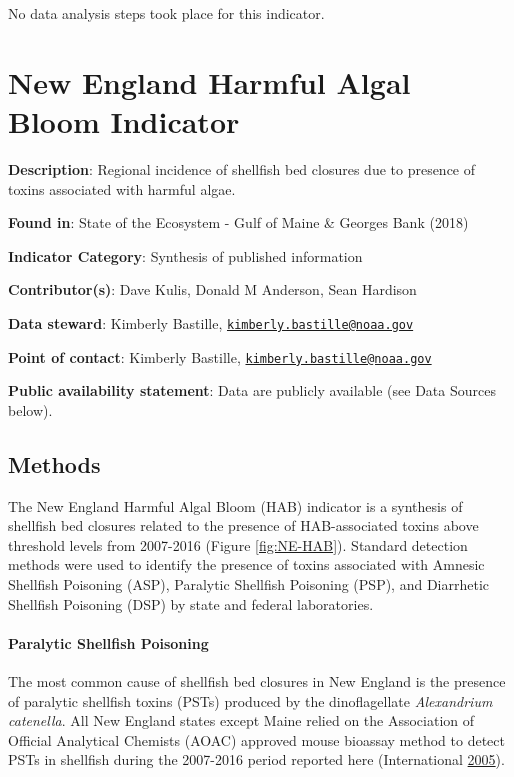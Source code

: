 \documentclass[
]{book}
\begin{document}
No data analysis steps took place for this indicator.

\hypertarget{new-england-harmful-algal-bloom-indicator}{%
\chapter{New England Harmful Algal Bloom Indicator}\label{new-england-harmful-algal-bloom-indicator}}

\textbf{Description}: Regional incidence of shellfish bed closures due to presence of toxins associated with harmful algae.

\textbf{Found in}: State of the Ecosystem - Gulf of Maine \& Georges Bank (2018)

\textbf{Indicator Category}: Synthesis of published information

\textbf{Contributor(s)}: Dave Kulis, Donald M Anderson, Sean Hardison

\textbf{Data steward}: Kimberly Bastille, \href{mailto:kimberly.bastille@noaa.gov}{\nolinkurl{kimberly.bastille@noaa.gov}}

\textbf{Point of contact}: Kimberly Bastille, \href{mailto:kimberly.bastille@noaa.gov}{\nolinkurl{kimberly.bastille@noaa.gov}}

\textbf{Public availability statement}: Data are publicly available (see Data Sources below).

\hypertarget{methods-23}{%
\section{Methods}\label{methods-23}}

The New England Harmful Algal Bloom (HAB) indicator is a synthesis of shellfish bed closures related to the presence of HAB-associated toxins above threshold levels from 2007-2016 (Figure \ref{fig:NE-HAB}). Standard detection methods were used to identify the presence of toxins associated with Amnesic Shellfish Poisoning (ASP), Paralytic Shellfish Poisoning (PSP), and Diarrhetic Shellfish Poisoning (DSP) by state and federal laboratories.

\hypertarget{paralytic-shellfish-poisoning}{%
\subsubsection{Paralytic Shellfish Poisoning}\label{paralytic-shellfish-poisoning}}

The most common cause of shellfish bed closures in New England is the presence of paralytic shellfish toxins (PSTs) produced by the dinoflagellate \emph{Alexandrium catenella}. All New England states except Maine relied on the Association of Official Analytical Chemists (AOAC) approved mouse bioassay method to detect PSTs in shellfish during the 2007-2016 period reported here (International \protect\hyperlink{ref-Anonymous2005}{2005}).
\end{document}

